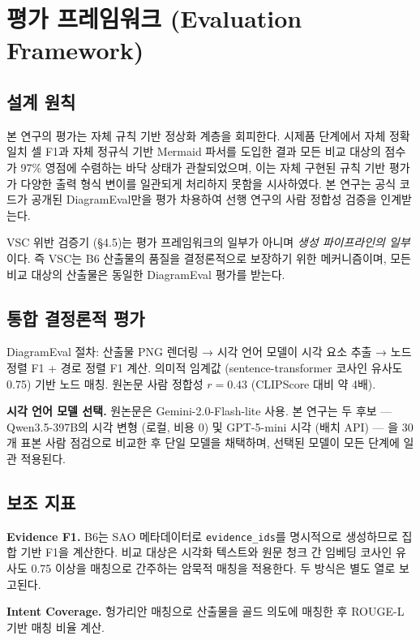 \documentclass[11pt]{article}
\begin{document}
\section{평가 프레임워크 (Evaluation Framework)}

\subsection{설계 원칙}

본 연구의 평가는 자체 규칙 기반 정상화 계층을 회피한다. 시제품 단계에서 자체 정확 일치 셀 F1과 자체 정규식 기반 Mermaid 파서를 도입한 결과 모든 비교 대상의 점수가 97\% 영점에 수렴하는 바닥 상태가 관찰되었으며, 이는 자체 구현된 규칙 기반 평가가 다양한 출력 형식 변이를 일관되게 처리하지 못함을 시사하였다. 본 연구는 공식 코드가 공개된 DiagramEval만을 평가 차용하여 선행 연구의 사람 정합성 검증을 인계받는다.

VSC 위반 검증기 (\S 4.5)는 평가 프레임워크의 일부가 아니며 \emph{생성 파이프라인의 일부}이다. 즉 VSC는 B6 산출물의 품질을 결정론적으로 보장하기 위한 메커니즘이며, 모든 비교 대상의 산출물은 동일한 DiagramEval 평가를 받는다.

\subsection{통합 결정론적 평가}

DiagramEval 절차: 산출물 PNG 렌더링 → 시각 언어 모델이 시각 요소 추출 → 노드 정렬 F1 + 경로 정렬 F1 계산. 의미적 임계값 (sentence-transformer 코사인 유사도 0.75) 기반 노드 매칭. 원논문 사람 정합성 $r=0.43$ (CLIPScore 대비 약 4배).

\textbf{시각 언어 모델 선택.} 원논문은 Gemini-2.0-Flash-lite 사용. 본 연구는 두 후보 — Qwen3.5-397B의 시각 변형 (로컬, 비용 0) 및 GPT-5-mini 시각 (배치 API) — 을 30개 표본 사람 점검으로 비교한 후 단일 모델을 채택하며, 선택된 모델이 모든 단계에 일관 적용된다.

\subsection{보조 지표}

\textbf{Evidence F1.} B6는 SAO 메타데이터로 \texttt{evidence\_ids}를 명시적으로 생성하므로 집합 기반 F1을 계산한다. 비교 대상은 시각화 텍스트와 원문 청크 간 임베딩 코사인 유사도 0.75 이상을 매칭으로 간주하는 암묵적 매칭을 적용한다. 두 방식은 별도 열로 보고된다.

\textbf{Intent Coverage.} 헝가리안 매칭으로 산출물을 골드 의도에 매칭한 후 ROUGE-L 기반 매칭 비율 계산.
\end{document}

